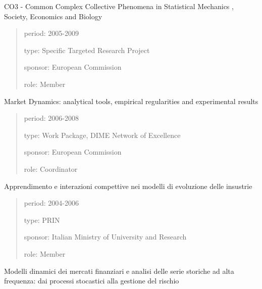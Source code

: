 \documentclass[a4paper]{article}
\newenvironment{DUfieldlist}%
    {\quote\description}
    {\enddescription\endquote}
\begin{document}
CO3 - Common Complex Collective Phenomena in Statistical Mechanics ,
Society, Economics and Biology

\begin{quote}
\begin{DUfieldlist}
\item[{period:}]
2005-2009

\item[{type:}]
Specific Targeted Research Project

\item[{sponsor:}]
European Commission

\item[{role:}]
Member
\end{DUfieldlist}
\end{quote}

Market Dynamics: analytical tools, empirical regularities and
experimental results

\begin{quote}
\begin{DUfieldlist}
\item[{period:}]
2006-2008

\item[{type:}]
Work Package, DIME Network of Excellence

\item[{sponsor:}]
European Commission

\item[{role:}]
Coordinator
\end{DUfieldlist}
\end{quote}

Apprendimento e interazioni compettive nei modelli di evoluzione delle
insustrie

\begin{quote}
\begin{DUfieldlist}
\item[{period:}]
2004-2006

\item[{type:}]
PRIN

\item[{sponsor:}]
Italian Ministry of University and Research

\item[{role:}]
Member
\end{DUfieldlist}
\end{quote}

Modelli dinamici dei mercati finanziari e analisi delle serie storiche
ad alta frequenza: dai processi stocastici alla gestione del rischio
\end{document}
